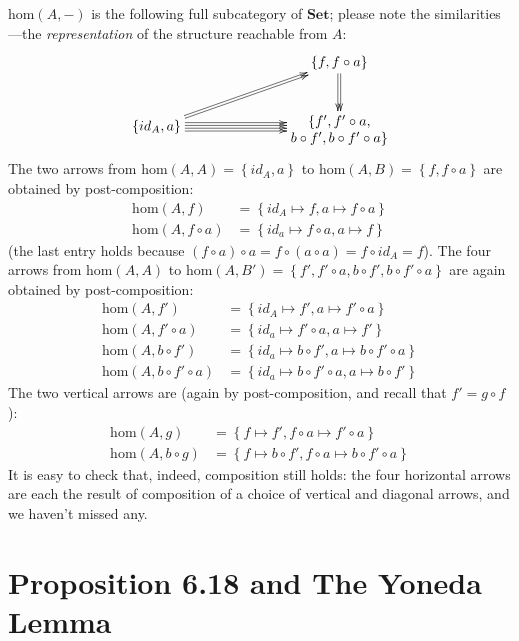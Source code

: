 \documentclass[10pt,letterpaper]{article}
\newcommand{\set}[1]{\left\{#1\right\}}
\begin{document}
$\mbox{hom}(A,-)$ is the following full subcategory of $\mathbf{Set}$; please
note the similarities---the {\em representation} of the structure reachable from $A$:
\[ \xymatrix@C=1in{
    & \set{f, f \circ a} \ar@<1pt>[d] \ar@<-1pt>[d] \\
  \set{id_A, a} \ar@<1pt>[ru] \ar@<-1pt>[ru]
                \ar@<3pt>[r] \ar@<1pt>[r] \ar@<-1pt>[r] \ar@<-3pt>[r]
    & \txt{$\{f', f' \circ a,$\\ $b \circ f', b \circ f' \circ a\}$} \\
} \]
The two arrows from $\mbox{hom}(A,A) = \set{id_A, a}$ to $\mbox{hom}(A,B)
= \set{f, f \circ a}$ are obtained by post-composition:
\begin{align*}
  \mbox{hom}(A,f) &= \set{ id_A \mapsto f, a \mapsto f \circ a } \\
  \mbox{hom}(A,f \circ a) &= \set{ id_a \mapsto f \circ a, a \mapsto f }
\end{align*}
(the last entry holds because $(f \circ a) \circ a = f \circ (a \circ a) = f
\circ id_A = f$).  The four arrows from $\mbox{hom}(A,A)$ to
$\mbox{hom}(A,B') = \set{f', f' \circ a, b \circ f', b \circ f' \circ a}$ are
again obtained by post-composition:
\begin{align*}
  \mbox{hom}(A,f') &= \set{id_A \mapsto f', a \mapsto f' \circ a} \\
  \mbox{hom}(A,f' \circ a) &= \set{id_a \mapsto f' \circ a, a \mapsto f'} \\
  \mbox{hom}(A,b \circ f') &= \set{id_a \mapsto b \circ f', a \mapsto b \circ f' \circ a} \\
  \mbox{hom}(A,b \circ f' \circ a) &= \set{id_a \mapsto b \circ f' \circ a, a \mapsto b \circ f'}
\end{align*}
The two vertical arrows are (again by post-composition, and recall that $f' = g \circ f$):
\begin{align*}
  \mbox{hom}(A,g) &= \set{f \mapsto f', f \circ a \mapsto f' \circ a} \\
  \mbox{hom}(A,b \circ g) &= \set{f \mapsto b \circ f', f \circ a \mapsto b \circ f' \circ a}
\end{align*}
It is easy to check that, indeed, composition still holds: the four horizontal
arrows are each the result of composition of a choice of vertical and diagonal arrows,
and we haven't missed any.

\pagebreak
\section{Proposition 6.18 and The Yoneda Lemma}
\end{document}
